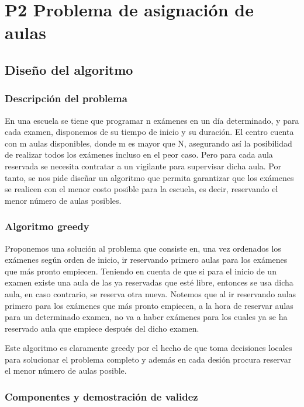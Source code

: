\documentclass{article}
\begin{document}
\section{P2 Problema de asignación de aulas}

\subsection{Diseño del algoritmo}

\subsubsection{Descripción del problema}

     En una escuela se tiene que programar n exámenes en un día determinado, y para cada examen, disponemos de su tiempo de inicio y su duración. El centro cuenta con m aulas disponibles, donde m es mayor que N, asegurando así la posibilidad de realizar todos los exámenes incluso en el peor caso.
     Pero para cada aula reservada se necesita contratar a un vigilante 
     para supervisar dicha aula. Por tanto, se nos pide diseñar un algoritmo que permita garantizar que los exámenes se realicen con el menor costo posible para la escuela, es decir, reservando el
     menor número de aulas posibles.

\subsubsection{Algoritmo greedy}

    Proponemos una solución al problema que consiste en, una vez ordenados los exámenes según orden de inicio, ir reservando primero aulas para los exámenes que más pronto empiecen. Teniendo en cuenta de que si para el inicio de un examen existe una aula de las ya reservadas que esté libre, entonces se usa dicha aula, en caso contrario, se reserva otra nueva.
    Notemos que al ir reservando aulas primero para los exámenes que más pronto empiecen, a la hora de reservar aulas para un determinado examen, no va a haber exámenes para los cuales ya se ha reservado aula que empiece después del dicho examen.

    Este algoritmo es claramente greedy por el hecho de que toma decisiones locales para solucionar el problema completo y además en cada desión procura reservar el menor número de aulas posible. \\

    
\subsubsection{Componentes y demostración de validez}
\end{document}
